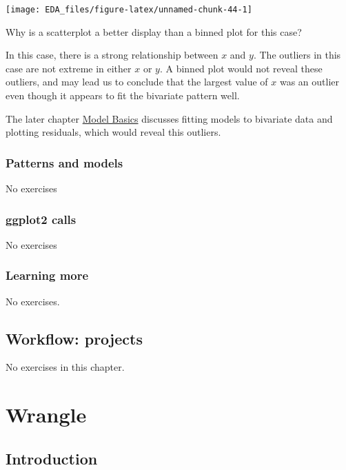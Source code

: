 \documentclass[]{book}
\theoremstyle{plain}
\theoremstyle{remark}
\begin{document}
\begin{center}\texttt{[image: EDA\_files/figure-latex/unnamed-chunk-44-1]} \end{center}

Why is a scatterplot a better display than a binned plot for this case?

In this case, there is a strong relationship between \(x\) and \(y\).
The outliers in this case are not extreme in either \(x\) or \(y\). A
binned plot would not reveal these outliers, and may lead us to conclude
that the largest value of \(x\) was an outlier even though it appears to
fit the bivariate pattern well.

The later chapter \protect\hyperlink{model-basics}{Model Basics}
discusses fitting models to bivariate data and plotting residuals, which
would reveal this outliers.

\hypertarget{patterns-and-models}{%
\section{Patterns and models}\label{patterns-and-models}}

No exercises

\hypertarget{ggplot2-calls}{%
\section{ggplot2 calls}\label{ggplot2-calls}}

No exercises

\hypertarget{learning-more}{%
\section{Learning more}\label{learning-more}}

No exercises.

\hypertarget{workflow-projects}{%
\chapter{Workflow: projects}\label{workflow-projects}}

No exercises in this chapter.

\hypertarget{part-wrangle}{%
\part{Wrangle}\label{part-wrangle}}

\hypertarget{introduction-4}{%
\chapter{Introduction}\label{introduction-4}}
\end{document}
